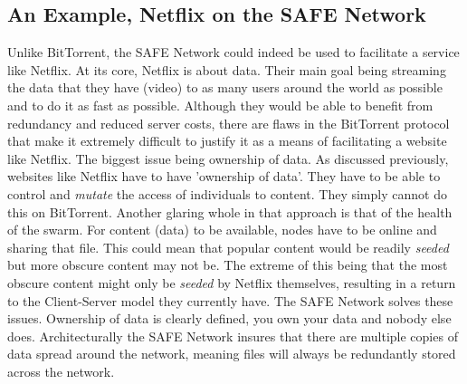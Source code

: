 \documentclass{l4proj}
\begin{document}
\subsection{An Example, Netflix on the SAFE Network}

Unlike BitTorrent, the SAFE Network could indeed be used to facilitate a service like Netflix. At its core, Netflix is about data. Their main goal being streaming the data that they have (video) to as many users around the world as possible and to do it as fast as possible. Although they would be able to benefit from redundancy and reduced server costs, there are flaws in the BitTorrent protocol that make it extremely difficult to justify it as a means of facilitating a website like Netflix. The biggest issue being ownership of data. As discussed previously, websites like Netflix have to have 'ownership of data'. They have to be able to control and \textit{mutate} the access of individuals to content. They simply cannot do this on BitTorrent. Another glaring whole in that approach is that of the health of the swarm. For content (data) to be available, nodes have to be online and sharing that file. This could mean that popular content would be readily \textit{seeded} but more obscure content may not be. The extreme of this being that the most obscure content might only be \textit{seeded} by Netflix themselves, resulting in a return to the Client-Server model they currently have. The SAFE Network solves these issues. Ownership of data is clearly defined, you own your data and nobody else does. Architecturally the SAFE Network insures that there are multiple copies of data spread around the network, meaning files will always be redundantly stored across the network. 
\end{document}
